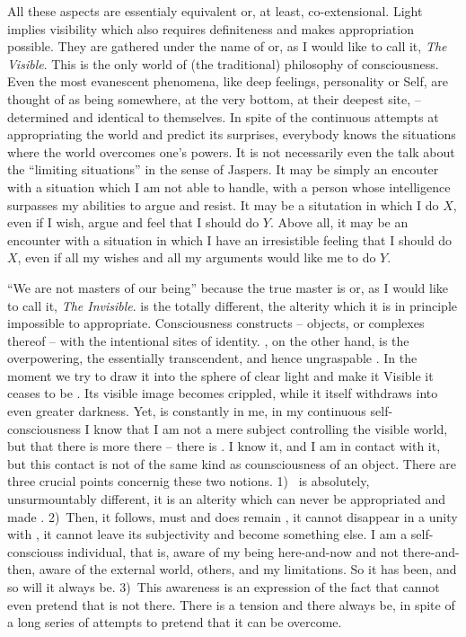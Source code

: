 All these aspects are essentialy equivalent or, at least, co-extensional. Light implies 
visibility which also requires definiteness and makes appropriation possible. 
They are gathered under the name of  or, as I would like
to call it, {\em The Visible}. 
This is the only world of (the traditional) philosophy of 
consciousness. Even the
most evanescent phenomena, like deep feelings, personality or Self, are thought of as
being somewhere, at the very bottom, at their deepest site,  -- determined 
and identical to themselves.
%
In spite of the continuous attempts at appropriating the world and predict its surprises, 
everybody knows the situations where the world overcomes one's powers. It is not 
necessarily even the talk about the ``limiting situations'' in the sense of Jaspers. 
It may be simply an encouter with a situation which I am not able to handle, with a person
whose intelligence surpasses my abilities to argue and resist. It may be
a situtation in which I do $X$, even if I wish, argue and feel that I should do $Y$. 
Above all, it may be
an encounter with a situation in which I have an irresistible feeling that I should do $X$, 
even if all my wishes and all my arguments would like me to do $Y$. 

``We are not masters of our being'' because the true master is  or, as I 
would like to call it, {\em The Invisible}.
 is the totally different, the alterity which it is in principle impossible
to appropriate. 
Consciousness constructs  -- objects, or complexes thereof -- with the
intentional sites of identity. {}, on the other hand, is the overpowering, the
essentially transcendent, and hence ungraspable .
In the moment we try to draw it into the sphere of clear light and make it
Visible it ceases to be . Its visible image becomes crippled, while it itself
withdraws into even greater darkness.  Yet,  is constantly in me, in my continuous
self-consciousness I know that I am not a mere subject controlling the visible world, but
that there is more there -- there is . I know it, and I am in
contact with it, but this contact is not of the same kind as counsciousness of an object.
%
%
There are three crucial points concernig these two notions. 1)~ is absolutely, 
unsurmountably different, it is an alterity which can never be appropriated and made
. 2)~Then, it follows,  must and does remain , it cannot disappear
in a unity with , it cannot leave its subjectivity and become something else.
I am a self-consciouss individual, that is, aware of my being here-and-now and not 
there-and-then, aware of the external world, others, and my limitations. 
So it has been, and so 
will it always be. 3)~This awareness is an expression of the fact that
 cannot even pretend that  is not there. There is a tension and 
there always be, in spite of a long series of attempts to pretend that it can be overcome.

